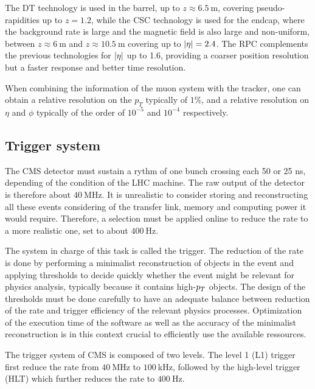         The DT technology is used in the barrel, up to $z \approx 6.5~\text{m}$, covering
        pseudo-rapidities up to $z = 1.2$, while the CSC technology is used for the endcap,
        where the background rate is large and the magnetic field is also large and non-uniform,
        between $z \approx 6~\text{m}$ and $z \approx 10.5~\text{m}$ covering up to $\left| \eta \right| = 2.4$.
        The RPC complements the previous technologies for $\left| \eta \right|$ up to 1.6, providing a
        coarser position resolution but a faster response and better time resolution.

        When combining the information of the muon system with the tracker, one can
        obtain a relative resolution on the $p_T$ typically of $1\%$, and a relative
        resolution on $\eta$ and $\phi$ typically of the order of $10^{-5}$ and $10^{-4}$
        respectively.

        \subsection{Trigger system}

        The CMS detector must sustain a rythm of one bunch crossing each 50 or 25 ns, depending
        of the condition of the LHC machine. The raw output of the detector is therefore
        about $40~$MHz. It is unrealistic to consider storing and reconstructing all these events
        considering of the transfer link, memory and computing power it would require.
        Therefore, a selection must be applied online to reduce the rate to a more realistic
        one, set to about $400~$Hz.

        The system in charge of this task is called the trigger. The reduction of the rate
        is done by performing a minimalist reconstruction of objects in the event
        and applying thresholds to decide quickly whether the event might be relevant for
        physics analysis, typically because it contains high-$p_T$ objects. The design of
        the thresholds must be done carefully to have an adequate balance between reduction
        of the rate and trigger efficiency of the relevant physics processes. Optimization
        of the execution time of the software as well as the accuracy of the minimalist
        reconstruction is in this context crucial to efficiently use the available ressources.

        The trigger system of CMS is composed of two levels. The level 1 (L1) trigger first
        reduce the rate from $40~$MHz to $100~$kHz, followed by the high-level trigger (HLT)
        which further reduces the rate to $400~$Hz.

